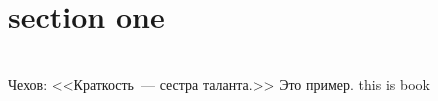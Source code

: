 \documentclass{book}
\begin{document}
\section{section one}
\\ \label{sec:cheh} Чехов: <<Краткость~--- сестра таланта.>> Это пример.
 this is book
\\
\makeindex
\printindex
\end{document}
